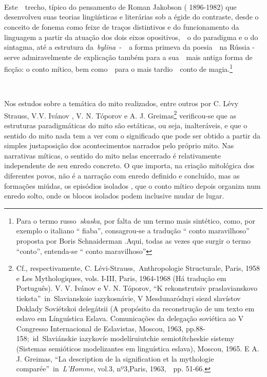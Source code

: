 ~

~

~

Este~~trecho, típico do pensamento de Roman Jakobson ( 1896-1982) que
desenvolveu suas teorias lingüísticas e literárias sob a égide do
contraste, desde o conceito de fonema como feixe de traços distintivos e
do funcionamento da linguagem a partir da atuação dos dois eixos
opositivos,~~o do paradigma e o do sintagma, até a estrutura
da~\emph{bylina}~-~~a forma primeva da poesia~~na Rússia - serve
admiravelmente de explicação também para a sua~~mais antiga forma de
ficção: o conto mítico, bem como~~para o mais tardio~~conto de
magia.\footnote{Para o termo russo~\emph{skaska}, por falta de um termo
  mais sintético, como, por exemplo o italiano `` fiaba'', consagrou-se
  a tradução `` conto maravilhoso'' proposta por Boris Schnaiderman
  .Aqui, todas as vezes que surgir o termo ``conto'', entenda-se ``
  conto maravilhoso''}

~

Nos estudos sobre a temática do mito realizados, entre outros por C.
Lévy Strauss, V.V. Ivánov , V. N. Tóporov e A. J. Greimas\footnote{Cf.,
  respectivamente, C. Lévi-Strauss,~{Anthropologie Structurale}, Paris,
  1958 e Les Mythologiques, vols. I-III, Paris, 1964-1968 (Há tradução
  em Português). V. V. Ivánov e V. N. Tóporov, ``K rekonstrutsiv
  praslavianskovo tieksta''~{in}~Slavianskoie iazykosnávie, V
  Mesdunaródnyi siezd slavístov Doklady Soviétskoi delegátsii (A
  propósito da reconstrução de um texto em eslavo em Línguística Eslava.
  Comunicações da delegação soviética ao V Congresso Internacional de
  Eslavistas, Moscou, 1963, pp.88-158;~{id}~Slaviánskie iazykovíe
  modelíruiutchie semiotítcheskie sistemy (Sistemas semióticos
  modelizantes em linguística eslava), Moscou, 1965. E A. J. Greimas,
  ``La description de la signification et la mythologie
  comparée''~{in}~\emph{{L'Homme}}, vol.3, nº3,Paris, 1963,~~pp. 51-66.}
verificou-se que as estruturas paradigmáticas do mito são estáticas, ou
seja, inalteráveis, e que o sentido do mito nada tem a ver com o
significado que pode ser obtido a partir da simples justaposição dos
acontecimentos narrados pelo próprio mito. Nas narrativas míticas, o
sentido do mito nelas encerrado é relativamente independente de seu
enredo concreto. O que importa, na criação mitológica dos diferentes
povos, não é a narração com enredo definido e concluído, mas as
formações miúdas, os episódios isolados , que o conto mítico depois
organiza num enredo solto, onde os blocos isolados podem inclusive mudar
de lugar.

